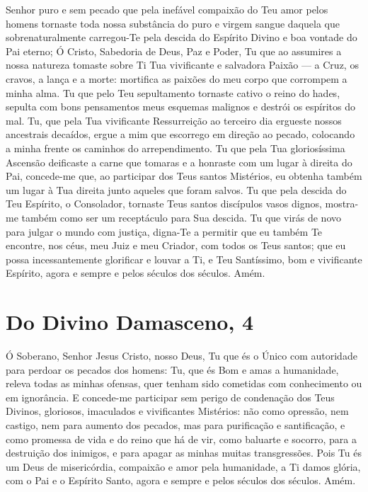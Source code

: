 \documentclass{subfiles}
\begin{document}
Senhor puro e sem pecado que pela inefável compaixão do Teu amor
pelos homens tornaste toda nossa substância do puro e virgem sangue
daquela que sobrenaturalmente carregou-Te pela descida do Espírito Divino e
boa vontade do Pai eterno; Ó Cristo, Sabedoria de Deus, Paz e Poder, Tu que
ao assumires a nossa natureza tomaste sobre Ti Tua vivificante e salvadora
Paixão — a Cruz, os cravos, a lança e a morte: mortifica as paixões do meu
corpo que corrompem a minha alma. Tu que pelo Teu sepultamento tornaste
cativo o reino do hades, sepulta com bons pensamentos meus esquemas
malignos e destrói os espíritos do mal. Tu, que pela Tua vivificante
Ressurreição ao terceiro dia ergueste nossos ancestrais decaídos, ergue a mim
que escorrego em direção ao pecado, colocando a minha frente os caminhos
do arrependimento. Tu que pela Tua gloriosíssima Ascensão deificaste a carne
que tomaras e a honraste com um lugar à direita do Pai, concede-me que, ao
participar dos Teus santos Mistérios, eu obtenha também um lugar à Tua
direita junto aqueles que foram salvos. Tu que pela descida do Teu Espírito, o
Consolador, tornaste Teus santos discípulos vasos dignos, mostra-me também
como ser um receptáculo para Sua descida. Tu que virás de novo para julgar o
mundo com justiça, digna-Te a permitir que eu também Te encontre, nos céus,
meu Juiz e meu Criador, com todos os Teus santos; que eu possa
incessantemente glorificar e louvar a Ti, e Teu Santíssimo, bom e vivificante
Espírito, agora e sempre e pelos séculos dos séculos. Amém.

\section*{Do Divino Damasceno, 4}

Ó Soberano, Senhor Jesus Cristo, nosso Deus, Tu que és o Único com autoridade
para perdoar os pecados dos homens: Tu, que és Bom e amas a humanidade, releva
todas as minhas ofensas, quer tenham sido cometidas com conhecimento ou em
ignorância. E concede-me participar sem perigo de condenação dos Teus Divinos,
gloriosos, imaculados e vivificantes Mistérios: não como opressão, nem castigo,
nem para aumento dos pecados, mas para purificação e santificação, e como
promessa de vida e do reino que há de vir, como baluarte e socorro, para a
destruição dos inimigos, e para apagar as minhas muitas transgressões. Pois Tu
és um Deus de misericórdia, compaixão e amor pela humanidade, a Ti damos glória,
com o Pai e o Espírito Santo, agora e sempre e pelos séculos dos séculos. Amém.
\end{document}
